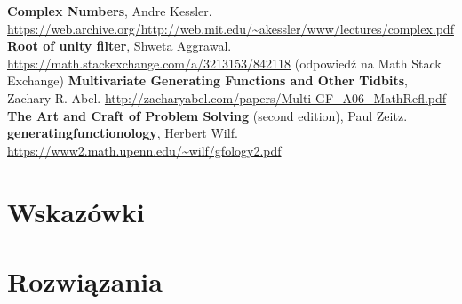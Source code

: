 \documentclass{scrartcl}
\begin{document}
\begin{thebibliography}{9}
     \textbf{Complex Numbers}, Andre Kessler.
        \url{https://web.archive.org/http://web.mit.edu/~akessler/www/lectures/complex.pdf}
     \textbf{Root of unity filter}, Shweta Aggrawal.
        \url{https://math.stackexchange.com/a/3213153/842118}
        (odpowiedź na Math Stack Exchange)
     \textbf{Multivariate Generating Functions and Other Tidbits}, Zachary R. Abel.
        \url{http://zacharyabel.com/papers/Multi-GF_A06_MathRefl.pdf}
     \textbf{The Art and Craft of Problem Solving} (second edition), Paul Zeitz.
     \textbf{generatingfunctionology}, Herbert Wilf.
        \url{https://www2.math.upenn.edu/~wilf/gfology2.pdf}
\end{thebibliography}

\newpage
\section{Wskazówki}
    \makehints

\section{Rozwiązania}
    \makeanswers
\end{document}
